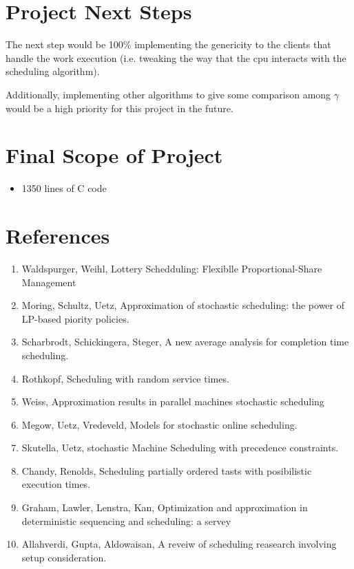 \documentclass[acmsmall]{acmart}
\begin{document}
\begin{multicols}{2}
\section{Project Next Steps}
  The next step would be 100$\%$ implementing the genericity to the clients that
  handle the work execution (i.e. tweaking the way that the cpu interacts with
  the scheduling algorithm).
  \par
  Additionally, implementing other algorithms to give some comparison among
  $\gamma$ would be a high priority for this project in the future.

\section{Final Scope of Project}
  \begin{itemize}
    \item 1350 lines of C code
  \end{itemize}

\end{multicols}
\section{References}
\begin{enumerate}
  \item Waldspurger, Weihl, Lottery Schedduling: Flexiblle Proportional-Share
    Management
  \item Moring, Schultz, Uetz, Approximation of stochastic scheduling: the
    power of LP-based piority policies.
  \item Scharbrodt, Schickingera, Steger, A new average analysis for completion
    time scheduling.
  \item Rothkopf, Scheduling with random service times.
  \item Weiss, Approximation results in parallel machines stochastic scheduling
  \item Megow, Uetz, Vredeveld, Models for stochastic online scheduling.
  \item Skutella, Uetz, stochastic Machine Scheduling with precedence
    constraints.
  \item Chandy, Renolds, Scheduling partially ordered tasts with posibilistic
    execution times.
  \item Graham, Lawler, Lenstra, Kan, Optimization and approximation in
    deterministic sequencing and scheduling: a servey
  \item Allahverdi, Gupta, Aldowaisan, A reveiw of scheduling reasearch
    involving setup consideration.
\end{enumerate}
\end{document}

